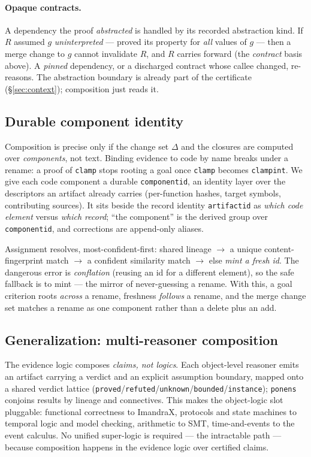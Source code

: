 \documentclass[11pt]{article}
\newcommand{\codeus}{\textunderscore\penalty100\relax}
\newcommand{\code}[1]{\texttt{\let\_\codeus #1}}
\begin{document}
\paragraph{Opaque contracts.} A dependency the proof \emph{abstracted} is handled by its recorded abstraction
kind. If $R$ assumed $g$ \emph{uninterpreted} --- proved its property for \emph{all} values of $g$ --- then a
merge change to $g$ cannot invalidate $R$, and $R$ carries forward (the \emph{contract} basis above). A
\emph{pinned} dependency, or a discharged contract whose callee changed, re-reasons. The abstraction
boundary is already part of the certificate (\S\ref{sec:context}); composition just reads it.

\subsection{Durable component identity}\label{sec:identity}

Composition is precise only if the change set $\Delta$ and the closures are computed over \emph{components},
not text. Binding evidence to code by name breaks under a rename: a proof of \code{clamp} stops rooting a
goal once \code{clamp} becomes \code{clamp\_int}. We give each code component a durable
\code{component\_id}, an identity layer over the descriptors an artifact already carries (per-function
hashes, target symbols, contributing sources). It sits beside the record identity \code{artifact\_id} as
\emph{which code element} versus \emph{which record}; ``the component'' is the derived group over
\code{component\_id}, and corrections are append-only aliases.

Assignment resolves, most-confident-first: shared lineage $\to$ a unique content-fingerprint match $\to$ a
confident similarity match $\to$ else \emph{mint a fresh id}. The dangerous error is \emph{conflation}
(reusing an id for a different element), so the safe fallback is to mint --- the mirror of never-guessing a
rename. With this, a goal criterion roots \emph{across} a rename, freshness \emph{follows} a rename, and the
merge change set matches a rename as one component rather than a delete plus an add.

\subsection{Generalization: multi-reasoner composition}\label{sec:multireasoner}

The evidence logic composes \emph{claims, not logics}. Each object-level reasoner emits an artifact carrying
a verdict and an explicit assumption boundary, mapped onto a shared verdict lattice
(\code{proved}/\code{refuted}/\code{unknown}/\code{bounded}/\code{instance}); \code{ponens} conjoins results
by lineage and connectives. This makes the object-logic slot pluggable: functional correctness to ImandraX,
protocols and state machines to temporal logic and model checking, arithmetic to SMT, time-and-events to the
event calculus. No unified super-logic is required --- the intractable path --- because composition happens
in the evidence logic over certified claims.
\end{document}
